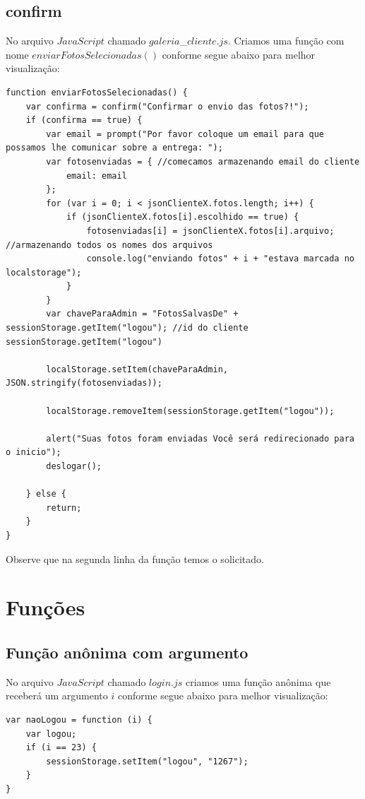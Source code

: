 \subsection{confirm}
	No arquivo $JavaScript$ chamado $galeria$\_$cliente.js$.
	Criamos uma função com nome $enviarFotosSelecionadas()$ conforme segue abaixo para melhor visualização:
	
\begin{lstlisting}
function enviarFotosSelecionadas() {
    var confirma = confirm("Confirmar o envio das fotos?!");
    if (confirma == true) {
        var email = prompt("Por favor coloque um email para que possamos lhe comunicar sobre a entrega: ");
        var fotosenviadas = { //comecamos armazenando email do cliente
            email: email
        };
        for (var i = 0; i < jsonClienteX.fotos.length; i++) {
            if (jsonClienteX.fotos[i].escolhido == true) {
                fotosenviadas[i] = jsonClienteX.fotos[i].arquivo; //armazenando todos os nomes dos arquivos
                console.log("enviando fotos" + i + "estava marcada no localstorage");
            }
        }
        var chaveParaAdmin = "FotosSalvasDe" + sessionStorage.getItem("logou"); //id do cliente sessionStorage.getItem("logou")
       
        localStorage.setItem(chaveParaAdmin, JSON.stringify(fotosenviadas));

        localStorage.removeItem(sessionStorage.getItem("logou"));

        alert("Suas fotos foram enviadas Você será redirecionado para o inicio");
        deslogar();

    } else {
        return;
    }
}
\end{lstlisting}
	Observe que na segunda linha da função temos o solicitado.

\section{Funções}
\subsection{Função anônima com argumento}
	No arquivo $JavaScript$ chamado $login.js$ criamos uma função anônima que receberá um argumento $i$ conforme segue abaixo para melhor visualização:
	
\begin{lstlisting}
var naoLogou = function (i) {
    var logou;
    if (i == 23) {
        sessionStorage.setItem("logou", "1267");
    }
}
\end{lstlisting}

